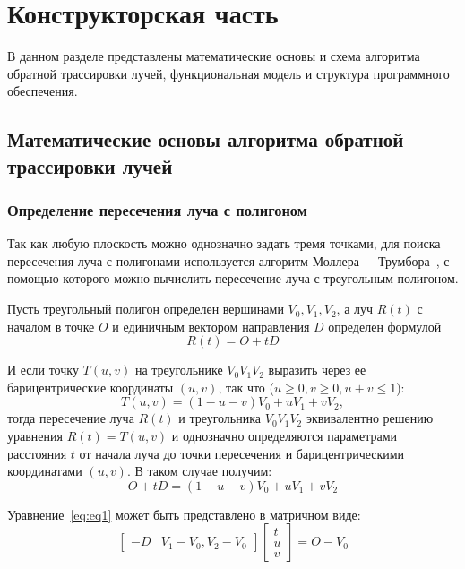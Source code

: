 \chapter{Конструкторская часть}

В данном разделе представлены математические основы и схема алгоритма обратной трассировки лучей, функциональная модель и структура программного обеспечения. 


\section{Математические основы алгоритма обратной трассировки лучей}
\subsection{Определение пересечения луча с полигоном}
Так как любую плоскость можно однозначно задать тремя точками, для поиска пересечения луча с полигонами используется алгоритм Моллера~--~Трумбора~\cite{trIntersect}, с помощью которого можно вычислить пересечение луча с треугольным полигоном.

Пусть треугольный полигон определен вершинами $V_0, V_1, V_2$, а луч $R(t)$ с началом в точке $O$ и единичным  вектором направления $D$ определен формулой
\begin{equation}
	R(t) = O + tD
\end{equation}

И если точку $T(u,v)$ на треугольнике $V_0V_1V_2$ выразить через ее барицентрические координаты $(u,v)$, так что ($u \geq 0, v \geq 0, u + v \leq 1$):
\begin{equation}
	T(u,v) = (1 - u - v)V_0 + uV_1 + vV_2,
\end{equation}
тогда пересечение луча $R(t)$ и треугольника $V_0V_1V_2$ эквивалентно решению уравнения
$R(t) = T(u, v)$ и однозначно определяются параметрами расстояния $t$ от начала луча до точки пересечения и барицентрическими координатами $(u,v)$. В таком случае получим:
\begin{equation}\label{eq:eq1}
	O + tD = (1- u - v)V_0 + uV_1 + vV_2
\end{equation}

Уравнение~\ref{eq:eq1} может быть представлено в матричном виде:
\begin{equation}
	\label{slau}
	\begin{bmatrix}
		-D & V_1 - V_0, V_2 - V_0
	\end{bmatrix}
	\begin{bmatrix}
		t\\
		u\\
		v
	\end{bmatrix} = O - V_0 
\end{equation}

